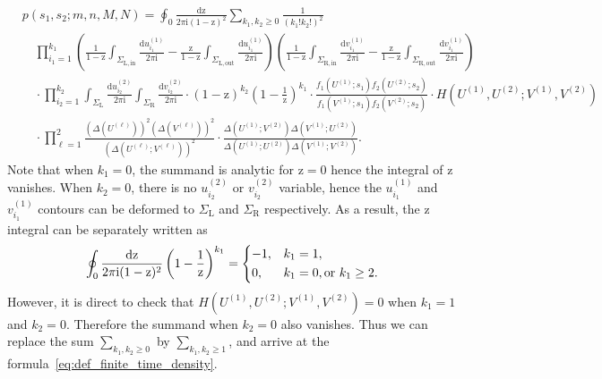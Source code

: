 \documentclass{article}
\numberwithin{equation}{section}
\newcommand{\ddbar}[2]{\frac{{\mathrm d}#1}{2\pi {\mathrm i}#2}}
\newcommand{\inn}{\mathrm{in}}
\newcommand{\LL}{\mathrm{L}}
\newcommand{\out}{\mathrm{out}}
\newcommand{\RR}{\mathrm{R}}
\begin{document}
\begin{equation}
	\label{eq:aux_30}
	\begin{split}
		&p(s_1,s_2;m,n,M,N)
		=\oint_0\ddbar{\mathrm{z}}{\mathrm{(1-z)^2}}\sum_{k_1,k_2\ge 0}
		\frac{1}{(k_1!k_2!)^2}\\
		&\quad
		\prod_{i_1=1}^{k_1}     
		\left(  \frac{1}{1-\mathrm{z}} \int_{\Sigma_{\LL,\inn}} 	    
		\ddbar{u^{(1)}_{i_1}}{}   
		-\frac{\mathrm{z}}{1-\mathrm{z}} \int_{\Sigma_{\LL,\out}} \ddbar{u^{(1)}_{i_1}}{}
		\right)
		\left(  \frac{1}{1-\mathrm{z}}  \int_{\Sigma_{\RR,\inn}}  
		\ddbar{v^{(1)}_{i_1}}{}
		-\frac{\mathrm{z}}{1-\mathrm{z}}   \int_{\Sigma_{\RR,\out}}
		\ddbar{v^{(1)}_{i_1}}{}
		\right)
		\\
		&\quad \cdot 
		\prod_{i_2=1}^{k_2}  
		\int_{\Sigma_\LL} \ddbar{u^{(2)}_{i_2}}{} 
		\int_{\Sigma_\RR} \ddbar{v^{(2)}_{i_2}}{} 
		\cdot    
		\left(1-\mathrm{z}\right)^{k_2}
		\left(1-\frac{1}{\mathrm{z}}\right)^{k_1}
		\cdot 
		\frac{f_1(U^{(1)};s_1)f_2(U^{(2)};s_2)}{f_1(V^{(1)};s_1)f_2(V^{(2)};s_2)}
		\cdot
		H(U^{(1)},U^{(2)};V^{(1)},V^{(2)})\\
		&\quad \cdot 
		\prod_{\ell=1}^2
		\frac{\left( \Delta(U^{(\ell)}) \right)^2
			\left( \Delta(V^{(\ell)}) \right)^2
		}
		{\left( \Delta(U^{(\ell)}; V^{(\ell)}) \right)^2}
		\cdot 
		\frac{\Delta(U^{(1)};V^{(2)})\Delta(V^{(1)};U^{(2)})}
		{\Delta(U^{(1)};U^{(2)})\Delta(V^{(1)};V^{(2)})}.
	\end{split}
\end{equation}
Note that when $k_1=0$, the summand is analytic for $\mathrm{z}=0$ hence the integral of $\mathrm{z}$ vanishes. When $k_2=0$, there is no $u^{(2)}_{i_2}$ or $v_{i_2}^{(2)}$ variable, hence the $u_{i_1}^{(1)}$ and $v_{i_1}^{(1)}$ contours can be deformed to $\Sigma_\LL$ and $\Sigma_\RR$ respectively. As a result, the $\mathrm{z}$ integral can be separately written as
\begin{equation*}
	\oint_0\ddbar{\mathrm{z}}{\mathrm{(1-z)^2}}\left(1-\frac{1}{\mathrm{z}}\right)^{k_1}=\begin{dcases}
		-1,& k_1=1,\\
		0,&k_1=0, \text{or }k_1\ge 2.
	\end{dcases}
\end{equation*}
However, it is direct to check that $H(U^{(1)},U^{(2)};V^{(1)},V^{(2)})=0$ when $k_1=1$ and $k_2=0$. Therefore the summand when $k_2=0$ also vanishes. Thus we can replace the sum $\sum_{k_1,k_2\ge 0}$ by $\sum_{k_1,k_2\ge 1}$, and
arrive at the formula~\eqref{eq:def_finite_time_density}.
\end{document}

